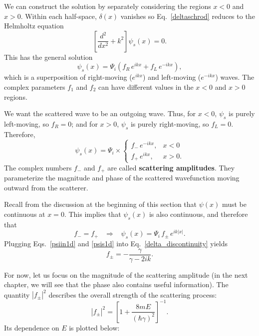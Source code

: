 \documentclass[pra,12pt]{revtex4-2}
\begin{document}
We can construct the solution by separately considering the regions $x
< 0$ and $x > 0$.  Within each half-space, $\delta(x)$ vanishes so
Eq.~\eqref{deltaschrod} reduces to the Helmholtz equation
\begin{equation}
  \left[\frac{d^2}{dx^2} + k^2\right] \psi_s(x) = 0.
\end{equation}
This has the general solution
\begin{equation}
  \psi_s(x) = \Psi_i \left(f_R \, e^{ik x} + f_L \, e^{-ik x}\right),
\end{equation}
which is a superposition of right-moving ($e^{ikx}$) and left-moving
($e^{-ikx}$) waves.  The complex parameters $f_1$ and $f_2$ can
have different values in the $x < 0$ and $x > 0$ regions.

We want the scattered wave to be an outgoing wave.  Thus, for $x < 0$,
$\psi_s$ is purely left-moving, so $f_R = 0$; and for $x > 0$,
$\psi_s$ is purely right-moving, so $f_L = 0$.  Therefore,
\begin{equation}
  \psi_s(x) = \Psi_i \times \begin{cases}f_- \,e^{-ikx}, & x < 0 \\ f_+ \,e^{ikx}, & x > 0.\end{cases}
\end{equation}
The complex numbers $f_-$ and $f_+$ are called \textbf{scattering
  amplitudes}.  They parameterize the magnitude and phase of the
scattered wavefunction moving outward from the scatterer.

Recall from the discussion at the beginning of this section that
$\psi(x)$ must be continuous at $x = 0$.  This implies that
$\psi_s(x)$ is also continuous, and therefore that
\begin{equation}
  f_- = f_+ \;\;\;\Rightarrow \;\;\;
  \psi_s(x) = \Psi_i \,f_\pm\, e^{ik|x|}.
  \label{psis1d}
\end{equation}
Plugging Eqs.~\eqref{psiin1d} and \eqref{psis1d} into
Eq.~\eqref{delta_discontinuity} yields
\begin{equation}
  f_\pm = -\frac{\gamma}{\gamma - 2ik}.
\end{equation}

For now, let us focus on the magnitude of the scattering amplitude (in
the next chapter, we will see that the phase also contains useful
information).  The quantity $|f_\pm|^2$ describes the overall strength
of the scattering process:
\begin{equation}
  |f_\pm|^2 = \left[1 + \frac{8mE}{(\hbar\gamma)^2}\right]^{-1}.
\end{equation}
Its dependence on $E$ is plotted below:
\end{document}
